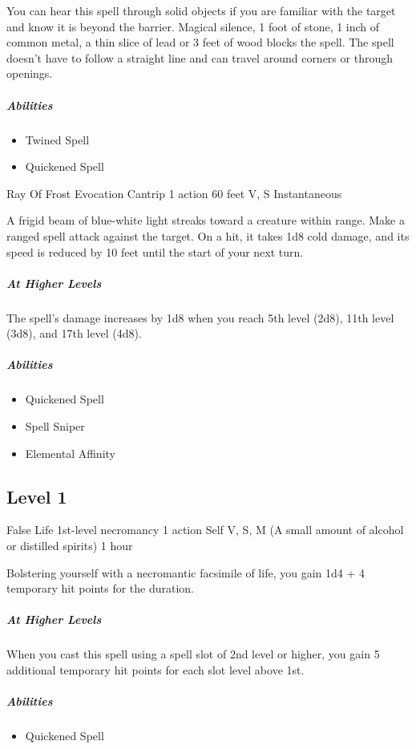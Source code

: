 \documentclass[a4paper,openany,twocolumn]{book}
\begin{document}
  You can hear this spell through solid objects if you are familiar with the target and know it is beyond the barrier. Magical silence, 1 foot of stone, 1 inch of common metal, a thin slice of lead or 3 feet of wood blocks the spell. The spell doesn't have to follow a straight line and can travel around corners or through openings.

\subparagraph*{Abilities}
\begin{itemize}
  \item Twined Spell
  \item Quickened Spell
\end{itemize}

\DndSpellHeader
  {Ray Of Frost}
  {Evocation Cantrip}
  {1 action}
  {60 feet}
  {V, S}
  {Instantaneous}

A frigid beam of blue-white light streaks toward a creature within range. Make a ranged spell attack against the target. On a hit, it takes 1d8 cold damage, and its speed is reduced by 10 feet until the start of your next turn.
    
\subparagraph*{At Higher Levels} The spell's damage increases by 1d8 when you reach 5th level (2d8), 11th level (3d8), and 17th level (4d8).

\subparagraph*{Abilities}
\begin{itemize}
  \item Quickened Spell
  \item Spell Sniper
  \item Elemental Affinity
\end{itemize}


\subsection*{Level 1}

\DndSpellHeader
  {False Life}
  {1st-level necromancy}
  {1 action}
  {Self}
  {V, S, M (A small amount of alcohol or distilled spirits)}
  {1 hour}

Bolstering yourself with a necromantic facsimile of life, you gain 1d4 + 4 temporary hit points for the duration.
    
\subparagraph*{At Higher Levels} When you cast this spell using a spell slot of 2nd level or higher, you gain 5 additional temporary hit points for each slot level above 1st.

\subparagraph*{Abilities}
\begin{itemize}
  \item Quickened Spell
\end{itemize}
\end{document}

